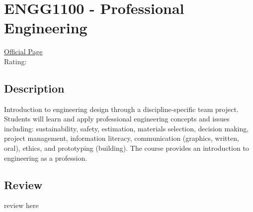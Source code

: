 \hypertarget{ENGG1100}{\section{ENGG1100 - Professional Engineering}}

\large
\textcolor{turbo_purple}{\href{https://my.uq.edu.au/programs-courses/course.html?course_code=ENGG1100}{Official Page}} \\
Rating: \cstar\cstar\cstar\cstar\ostar

\normalsize
\subsection*{Description}
Introduction to engineering design through a discipline-specific team project.
Students will learn and apply professional engineering concepts and issues including: sustainability, safety, estimation, materials selection, decision making, project management, information literacy, communication (graphics, written, oral), ethics, and prototyping (building).
The course provides an introduction to engineering as a profession.

\subsection*{Review}
review here
